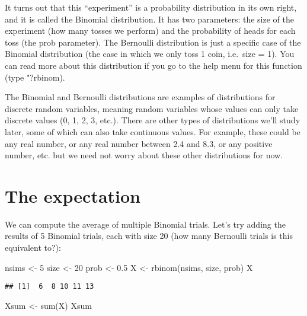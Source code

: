 \documentclass[
]{book}
\newenvironment{Shaded}{\begin{snugshade}}{\end{snugshade}}
\newcommand{\DecValTok}[1]{\textcolor[rgb]{0.00,0.00,0.81}{#1}}
\newcommand{\FloatTok}[1]{\textcolor[rgb]{0.00,0.00,0.81}{#1}}
\newcommand{\FunctionTok}[1]{\textcolor[rgb]{0.00,0.00,0.00}{#1}}
\newcommand{\NormalTok}[1]{#1}
\newcommand{\OtherTok}[1]{\textcolor[rgb]{0.56,0.35,0.01}{#1}}
\begin{document}
It turns out that this ``experiment'' is a probability distribution in its own right, and it is called the Binomial distribution. It has two parameters: the size of the experiment (how many tosses we perform) and the probability of heads for each toss (the prob parameter). The Bernoulli distribution is just a specific case of the Binomial distribution (the case in which we only toss 1 coin, i.e.~size = 1). You can read more about this distribution if you go to the help menu for this function (type "?rbinom).

The Binomial and Bernoulli distributions are examples of distributions for discrete random variables, meaning random variables whose values can only take discrete values (0, 1, 2, 3, etc.). There are other types of distributions we'll study later, some of which can also take continuous values. For example, these could be any real number, or any real number between 2.4 and 8.3, or any positive number, etc. but we need not worry about these other distributions for now.

\hypertarget{the-expectation}{%
\section{The expectation}\label{the-expectation}}

We can compute the average of multiple Binomial trials. Let's try adding the results of 5 Binomial trials, each with size 20 (how many Bernoulli trials is this equivalent to?):

\begin{Shaded}
\begin{Highlighting}[]
\NormalTok{nsims }\OtherTok{\textless{}{-}} \DecValTok{5}
\NormalTok{size }\OtherTok{\textless{}{-}} \DecValTok{20}
\NormalTok{prob }\OtherTok{\textless{}{-}} \FloatTok{0.5}
\NormalTok{X }\OtherTok{\textless{}{-}} \FunctionTok{rbinom}\NormalTok{(nsims, size, prob)}
\NormalTok{X}
\end{Highlighting}
\end{Shaded}

\begin{verbatim}
## [1]  6  8 10 11 13
\end{verbatim}

\begin{Shaded}
\begin{Highlighting}[]
\NormalTok{Xsum }\OtherTok{\textless{}{-}} \FunctionTok{sum}\NormalTok{(X)}
\NormalTok{Xsum}
\end{Highlighting}
\end{Shaded}
\end{document}
